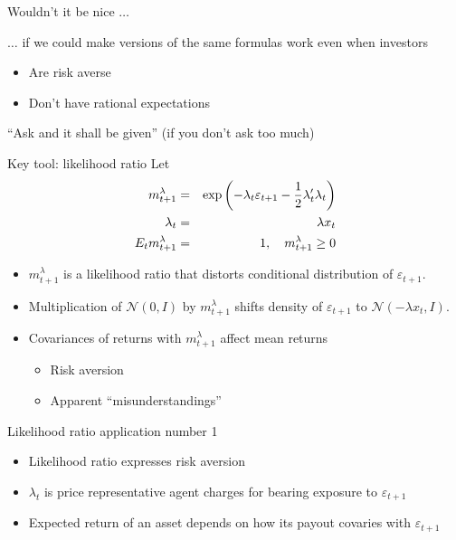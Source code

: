 \documentclass{beamer}
\theoremstyle{Definition}
\begin{document}
\begin{frame}{Wouldn't it  be nice  $\ldots$}



$\ldots$ if we could make versions of the  same formulas work even when investors
\begin{itemize}
\item Are risk averse
\item Don't have rational expectations
\end{itemize}



\medskip

``Ask and it shall be given'' (if you don't ask  too much)

\end{frame}


\begin{frame}{Key tool: likelihood ratio}
Let
\begin{eqnarray*}
 m_{t+1}^\lambda & = & \exp\left(-\lambda_t \varepsilon_{t+1} - \frac{1}{2} \lambda_t ' \lambda_t \right) \cr
 \lambda_t &= &  \lambda x_t \cr
 E_t m_{t+1}^\lambda &= &1, \quad m_{t+1}^\lambda \geq 0
 \end{eqnarray*}


\begin{itemize}
\item  $m_{t+1}^\lambda$ is  a likelihood ratio that distorts  conditional distribution of $\varepsilon_{t+1}$.
\item Multiplication of ${\mathcal N}(0, I)$  by $m_{t+1}^\lambda$ shifts  density of
$\varepsilon_{t+1}$ to ${\mathcal N}(- \lambda x_t, I)$.
\item Covariances of returns with $m_{t+1}^\lambda$ affect   mean returns
\begin{itemize}
\item Risk aversion
\item Apparent ``misunderstandings''
\end{itemize}
\end{itemize}
\end{frame}


\begin{frame}{Likelihood ratio application number 1}

\begin{itemize}
\item  Likelihood ratio expresses risk aversion
\item $\lambda_t$ is price  representative agent charges for bearing exposure to $\varepsilon_{t+1}$
\item Expected return of an asset depends on how its payout covaries with  $\varepsilon_{t+1}$

\end{itemize}
\end{frame}
\end{document}
